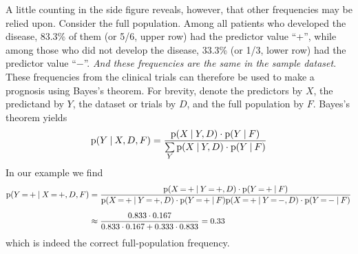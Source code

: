 \documentclass[utf8]{FrontiersinHarvard} %
\newcommand*{\mo}[1][=]{\mathord{\,#1\,}}
\newcommand*{\p}{\mathrm{p}}%
\renewcommand*{\|}[1][]{\nonscript\:#1\vert\nonscript\:\mathopen{}}
\begin{document}
A little counting in the side figure reveals, however, that other frequencies may be relied upon. Consider the full population. Among all patients who developed the disease, 83.3\% of them (or 5/6, upper row) had the predictor value \enquote{+}, while among those who did not develop the disease, 33.3\% (or 1/3, lower row) had the predictor value \enquote{$-$}. \emph{And these frequencies are the same in the sample dataset}. These frequencies from the clinical trials can therefore be used to make a prognosis using Bayes's theorem. For brevity, denote the predictors by $X$, the predictand by $Y$, the dataset or trials by $D$, and the full population by $F$. Bayes's theorem yields
\begin{equation}
  \label{eq:base-rate_correction}
  \p(Y \| X, D, F) =
  \frac{ \p(X \| Y, D) \cdot   \p(Y \| F)
}{\sum\limits_{Y} \p(X \| Y,  D) \cdot   \p(Y \| F)
}
\end{equation}
In our example we find
\begin{equation}
  \label{eq:base-rate_correction_example}
 \begin{split}
   \p(Y\mo\mathord{+} \| X\mo\mathord{+}, D, F)
   &=
  \frac{
    \p(X\mo\mathord{+} \| Y\mo\mathord{+}, D)
  \cdot   \p(Y\mo\mathord{+} \| F)
}{
  \p(X\mo\mathord{+} \| Y\mo\mathord{+}, D) 
  \cdot   \p(Y\mo\mathord{+} \| F)
    \p(X\mo\mathord{+} \| Y\mo\mathord{-}, D)
  \cdot   \p(Y\mo\mathord{-} \| F)
} \\[2\jot]
&\approx
  \frac{ 0.833 \cdot 0.167}{0.833 \cdot 0.167 + 0.333 \cdot 0.833}
  = 0.33
  \end{split}
\end{equation}
which is indeed the correct full-population frequency.
\end{document}
